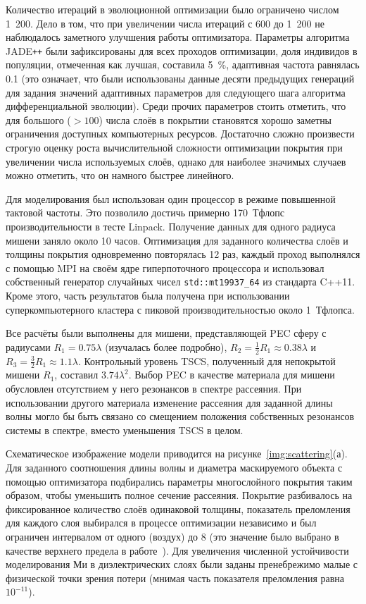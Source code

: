 Количество итераций в эволюционной оптимизации было ограничено числом
1~200. Дело в том, что при увеличении числа итераций с 600 до 1~200 не
наблюдалось заметного улучшения работы оптимизатора. 
Параметры алгоритма JADE\texttt{++} были зафиксированы для всех проходов
оптимизации, доля индивидов в популяции, отмеченная как лучшая,
составила 5~\%, адаптивная частота равнялась 0.1 (это означает, что
были использованы данные десяти предыдущих генераций для задания
значений адаптивных параметров для следующего шага алгоритма
дифференциальной эволюции).  Среди прочих параметров стоить отметить,
что для большого ($>100$) числа слоёв в покрытии становятся хорошо
заметны ограничения доступных компьютерных ресурсов. Достаточно
сложно произвести строгую оценку роста вычислительной сложности
оптимизации покрытия при увеличении числа используемых слоёв, однако
для наиболее значимых случаев можно отметить, что он намного быстрее
линейного.

Для моделирования был использован один процессор в режиме повышенной
тактовой частоты. Это позволило достичь примерно 170~Тфлопс
производительности в тесте Linpack. Получение данных для одного
радиуса мишени заняло около 10 часов. Оптимизация для
заданного количества слоёв и толщины покрытия одновременно повторялась
12 раз, каждый проход выполнялся с помощью MPI на своём
ядре гиперпоточного процессора и использовал собственный генератор
случайных чисел \verb+std::mt19937_64+ из стандарта C++11. Кроме
этого, часть результатов была получена при использовании
суперкомпьютерного кластера с пиковой производительностью около
1~Тфлопса.

Все расчёты были выполнены для мишени, представляющей PEC сферу с
радиусами ${R_1 = 0.75\lambda}$ (изучалась более подробно),
${R_2 = \frac{1}{2}R_1\approx 0.38\lambda}$ и
${R_3 = \frac{3}{2}R_1 \approx 1.1\lambda}$.  Контрольный уровень
TSCS, полученный для непокрытой мишени ${R_1}$, составил
$3.74\lambda^2$.  Выбор PEC в качестве материала для мишени обусловлен
отсутствием у него резонансов в спектре рассеяния. При использовании
другого материала изменение рассеяния для заданной длины волны могло
бы быть связано со смещением положения собственных резонансов системы
в спектре, вместо уменьшения TSCS в целом.

Схематическое изображение модели приводится на
рисунке~\ref{img:scattering}(а). Для заданного соотношения длины волны
и диаметра маскируемого объекта с помощью оптимизатора подбирались
параметры многослойного покрытия таким образом, чтобы уменьшить полное
сечение рассеяния.  Покрытие разбивалось на фиксированное количество
слоёв одинаковой толщины, показатель преломления для каждого слоя
выбирался в процессе оптимизации независимо и был ограничен интервалом
от одного (воздух) до $8$ (это значение было выбрано в качестве
верхнего предела в работе~\cite{semouchkina2}).  Для увеличения
численной устойчивости моделирования Ми в диэлектрических слоях были
заданы пренебрежимо малые с физической точки зрения потери (мнимая
часть показателя преломления равна $10^{-11}$).

